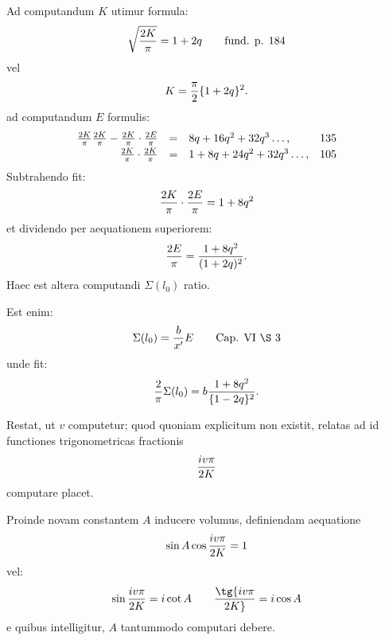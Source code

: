\begingroup\small
{}

Ad computandum $K$ utimur formula:
\[
 \sqrt{2K\over\pi}=1+2q \qquad \text{fund. p. 184}
\]
vel
\[
 K={\pi\over2}\{1+2q\}^2.
\]
ad computandum $E$ formulis:
\[
\begin{array}{rcll}
 {2K\over\pi}{2K\over\pi}-{2K\over\pi}\cdot {2E\over\pi}&=&8q+16q^2+32q^3\ldots, &135\vspace{0.2em}\\
 {2K\over\pi}\cdot{2K\over\pi}&=&1+8q+24q^2+32q^3\ldots, &105
\end{array}
\]
Subtrahendo fit:
\[
 {2K\over\pi}\cdot {2E\over\pi}=1+8q^2
\]
et dividendo per aequationem superiorem:
\[
 {2E\over\pi}={1+8q^2\over (1+2q)^2}.
\]
Haec est altera computandi $\Sigma(l_0)$ ratio.

Est enim:
\[
 \Sigma(l_0)={b\over x'}E \qquad \text{Cap. VI \S\ 3}
\]
unde fit:
\[
 {2\over\pi}\Sigma(l_0)=b{1+8q^2\over \{1-2q\}^2}.
\]


Restat, ut $v$ computetur; quod quoniam explicitum non existit, relatas ad id functiones trigonometricas fractionis
\[
 {iv\pi\over2K}
\]
computare placet.

Proinde novam constantem $A$ inducere volumus, definiendam aequatione
\[
 \sin A\cos {iv\pi\over2K}=1
\]
vel:
\[
 \sin {iv\pi\over2K}=i\cot A
 \qquad
 \tg {iv\pi\over2K}=i\cos A
\]
e quibus intelligitur, $A$ tantummodo computari debere.
\endgroup
